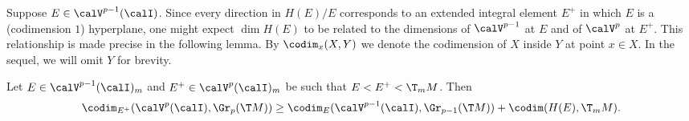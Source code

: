 Suppose $E\in\calV^{p-1}(\calI)$. Since every direction in $H(E)\slash E$ corresponds to an extended integral element $E^+$ in which $E$ is a (codimension $1$) hyperplane, one might expect $\dim H(E)$ to be related to the dimensions of $\calV^{p-1}$ at $E$ and of $\calV^p$ at $E^+$. This relationship is made precise in the following lemma. By $\codim_x(X,Y)$ we denote the codimension of $X$ inside $Y$ at point $x\in X$. In the sequel, we will omit $Y$ for brevity.

\begin{lem}\label{lem 8.1.10 Ivey}
    Let $E\in\calV^{p-1}(\calI)_m$ and $E^+\in \calV^p(\calI)_m$ be such that $E<E^+<\T_m M$. Then 
    \[\codim_{E^+}(\calV^p(\calI),\Gr_p(\T M))\geq \codim_E(\calV^{p-1}(\calI),\Gr_{p-1}(\T M))+\codim(H(E),\T_m M).\label{eq codim inequality}\]
\end{lem}
